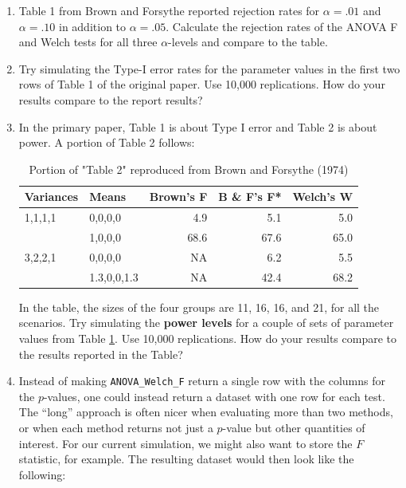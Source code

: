 \documentclass[
]{book}
\begin{document}
\begin{enumerate}
\def\labelenumi{\arabic{enumi}.}
\item
  Table 1 from Brown and Forsythe reported rejection rates for \(\alpha = .01\) and \(\alpha = .10\) in addition to \(\alpha = .05\). Calculate the rejection rates of the ANOVA F and Welch tests for all three \(\alpha\)-levels and compare to the table.
\item
  Try simulating the Type-I error rates for the parameter values in the first two rows of Table 1 of the original paper. Use 10,000 replications. How do your results compare to the report results?
\item
  In the primary paper, Table 1 is about Type I error and Table 2 is about power. A portion of Table 2 follows:

  \begin{table}

   \caption{\label{tab:BF-power}Portion of "Table 2" reproduced from Brown and Forsythe (1974)}
   \centering
   \begin{tabular}[t]{l|l|r|r|r}
   \hline
   Variances & Means & Brown's F & B \& F's F* & Welch's W\\
   \hline
   1,1,1,1 & 0,0,0,0 & 4.9 & 5.1 & 5.0\\
   \hline
    & 1,0,0,0 & 68.6 & 67.6 & 65.0\\
   \hline
   3,2,2,1 & 0,0,0,0 & NA & 6.2 & 5.5\\
   \hline
    & 1.3,0,0,1.3 & NA & 42.4 & 68.2\\
   \hline
   \end{tabular}
   \end{table}

  In the table, the sizes of the four groups are 11, 16, 16, and 21, for all the scenarios.
  Try simulating the \textbf{power levels} for a couple of sets of parameter values from Table \ref{tab:BF-power}.
  Use 10,000 replications.
  How do your results compare to the results reported in the Table?
\item
  Instead of making \texttt{ANOVA\_Welch\_F} return a single row with the columns for the \(p\)-values, one could instead return a dataset with one row for each test. The ``long'' approach is often nicer when evaluating more than two methods, or when each method returns not just a \(p\)-value but other quantities of interest. For our current simulation, we might also want to store the \(F\) statistic, for example. The resulting dataset would then look like the following:


\end{enumerate}
\end{document}
